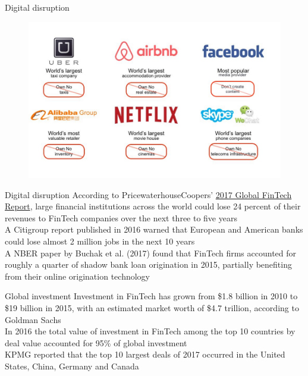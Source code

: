 \documentclass[11pt]{beamer}
\begin{document}
\begin{frame}{Digital disruption}
	\begin{figure}[]
		\centering
		\includegraphics  [scale=0.3]{Images/disruption}
	\end{figure}
\end{frame}


\begin{frame}{Digital disruption}
	According to PricewaterhouseCoopers' \href{http://www.pwc.com/ee/et/publications/pub/pwc-global-fintech-report-2017.pdf}{2017 Global FinTech Report}, large financial institutions across the world could lose 24 percent of their revenues to FinTech companies over the next three to five years\\ \vspace{3mm}
	A Citigroup report published in 2016 warned that European and American banks could lose almost 2 million jobs in the next 10 years \\ \vspace{3mm}
	A NBER paper by Buchak et al. (2017) found that FinTech firms accounted for roughly a quarter of shadow bank loan origination in 2015, partially benefiting from their online origination technology \\ \vspace{3mm}
\end{frame}


\begin{frame}{Global investment}
	Investment in FinTech has grown from \$1.8 billion in 2010 to \$19 billion in 2015, with an estimated market worth of \$4.7 trillion, according to Goldman Sachs \\ \vspace{3mm}
	In 2016 the total value of investment in FinTech among the top 10 countries by deal value accounted for 95\% of global investment \\ \vspace{3mm}
	KPMG reported that the top 10 largest deals of 2017 occurred in the United States, China, Germany and Canada
\end{frame}
\end{document}
